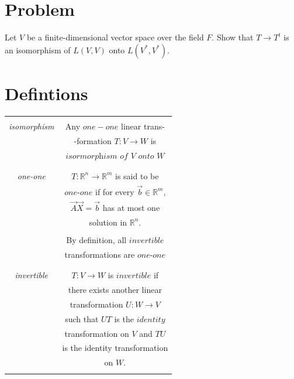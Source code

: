 \documentclass[journal,12pt,twocolumn]{IEEEtran}
\begin{document}
\section{Problem}
Let $V$ be a finite-dimensional vector space over the field $F$. Show that $T \rightarrow T^t$ is an isomorphism of $L(V,V)$ onto $L(V^*,V^*)$.
\section{Defintions}
\begin{table}[h]
	\begin{center}
		\begin{tabular}{|c|c|}
			\hline
			& \\
			\textit{isomorphism} & Any $one-one$ linear trans-\\
			& -formation $T : V\rightarrow W$ is \\
			& $\textit{isormorphism of}$ $V$ $\textit{onto}$ $W$\\
			& \\
			\hline	
			& \\		
			\textit{one-one} & $T : \mathbb{R}^{n} \rightarrow \mathbb{R}^{m}$ is said to be\\
			& $\textit{one-one}$ if for every  $\vec{b} \in \mathbb{R}^{m}$,  \\
			& $\vec{A}\vec{X} =\vec{b}$ has at most one\\
			& solution in $\mathbb{R}^{n}$.\\
			& \\
			& By definition, all $invertible$\\
			& transformations are $\textit{one-one}$\\
			& \\
			\hline
			& \\
			\textit{invertible} & $T : V \rightarrow W$ is $\textit{invertible}$ if\\
			& there exists another linear\\
			& transformation $U: W \rightarrow V$\\
			& such that $UT$ is the $identity$\\
			& transformation on $V$ and $TU$\\
			& is the identity transformation\\
			& on $W$.\\
			& \\
			\hline
		\end{tabular}
	\end{center}
\end{table}
\pagebreak
\end{document}
